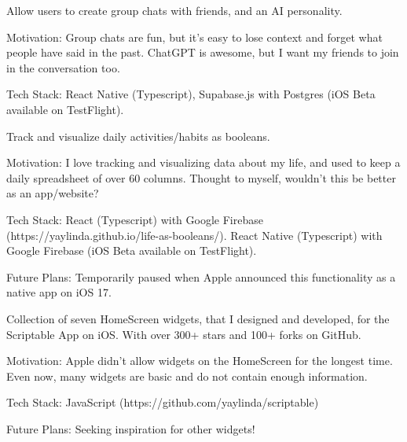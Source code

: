 \documentclass[letterpaper]{deedy-resume-openfont} %
\begin{document}
\descript{}
\begin{tightemize}
\item Allow users to create group chats with friends, and an AI personality.
\item Motivation: Group chats are fun, but it's easy to lose context and forget what people have said in the past. ChatGPT is awesome, but I want my friends to join in the conversation too.
\item Tech Stack: React Native (Typescript), Supabase.js with Postgres (iOS Beta available on TestFlight).
\end{tightemize}
\sectionsep %

\descript{}
\begin{tightemize}
\item Track and visualize daily activities/habits as booleans.
\item Motivation: I love tracking and visualizing data about my life, and used to keep a daily spreadsheet of over 60 columns. Thought to myself, wouldn't this be better as an app/website?
\item Tech Stack: React (Typescript) with Google Firebase (https://yaylinda.github.io/life-as-booleans/). React Native (Typescript) with Google Firebase (iOS Beta available on TestFlight).
\item Future Plans: Temporarily paused when Apple announced this functionality as a native app on iOS 17.
\end{tightemize}
\sectionsep %

\descript{}
\begin{tightemize}
\item Collection of seven HomeScreen widgets, that I designed and developed, for the Scriptable App on iOS. With over 300+ stars and 100+ forks on GitHub.
\item Motivation: Apple didn't allow widgets on the HomeScreen for the longest time. Even now, many widgets are basic and do not contain enough information.
\item Tech Stack: JavaScript (https://github.com/yaylinda/scriptable)
\item Future Plans: Seeking inspiration for other widgets!
\end{tightemize}
\sectionsep %

\end{document}
